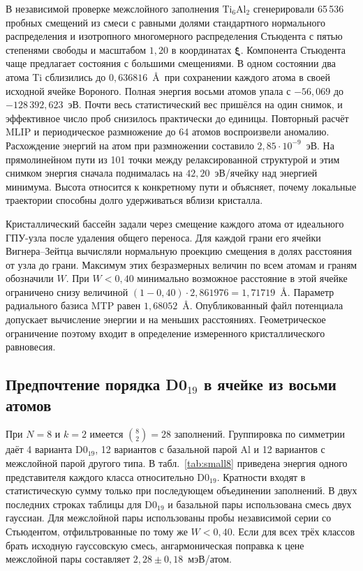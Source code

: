 \documentclass[11pt,a4paper]{article}
\begin{document}
В независимой проверке межслойного заполнения $\mathrm{Ti}_6\mathrm{Al}_2$
сгенерировали 65\,536 пробных смещений из смеси с равными долями
стандартного нормального распределения и изотропного многомерного распределения
Стьюдента с пятью степенями свободы и масштабом $1{,}20$ в координатах
$\boldsymbol\xi$. Компонента Стьюдента чаще предлагает состояния с большими
смещениями. В одном состоянии два атома Ti
сблизились до $0{,}636816$~\AA\ при сохранении каждого атома в своей исходной
ячейке Вороного. Полная энергия восьми атомов упала с $-56{,}069$ до
$-128\,392{,}623$~эВ. Почти весь статистический вес пришёлся на один снимок,
и эффективное число проб снизилось практически до единицы.
Повторный расчёт MLIP и периодическое размножение до 64 атомов воспроизвели
аномалию. Расхождение энергий на атом при размножении составило
$2{,}85\cdot10^{-9}$~эВ. На прямолинейном пути из 101 точки между релаксированной
структурой и этим снимком энергия сначала поднималась на $42{,}20$~эВ/ячейку
над энергией минимума. Высота относится к конкретному пути и объясняет, почему
локальные траектории способны долго удерживаться вблизи кристалла.

Кристаллический бассейн задали через смещение каждого атома от идеального
ГПУ-узла после удаления общего переноса. Для каждой грани его ячейки
Вигнера--Зейтца вычисляли нормальную проекцию смещения в долях расстояния
от узла до грани. Максимум этих безразмерных величин по всем атомам и
граням обозначили $W$. При $W<0{,}40$ минимально возможное расстояние в
этой ячейке ограничено снизу величиной
$(1-0{,}40)\cdot 2{,}861976 = 1{,}71719$~\AA. Параметр радиального базиса
MTP равен $1{,}68052$~\AA. Опубликованный файл потенциала допускает
вычисление энергии и на меньших расстояниях. Геометрическое ограничение
поэтому входит в определение измеренного кристаллического равновесия.

\subsection{Предпочтение порядка \texorpdfstring{D0$_{19}$}{D0₁₉} в ячейке из восьми атомов}

При $N=8$ и $k=2$ имеется $\binom82=28$ заполнений. Группировка по симметрии
даёт 4 варианта D0$_{19}$, 12 вариантов с базальной парой Al и 12 вариантов
с межслойной парой другого типа. В табл.~\ref{tab:small8} приведена энергия
одного представителя каждого класса относительно D0$_{19}$. Кратности входят
в статистическую сумму только при последующем объединении заполнений.
В двух последних строках таблицы для D0$_{19}$ и базальной пары использована
смесь двух гауссиан. Для межслойной пары использованы пробы независимой серии
со Стьюдентом, отфильтрованные по тому же $W<0{,}40$. Если для всех трёх
классов брать исходную гауссовскую смесь, ангармоническая поправка к цене
межслойной пары составляет $2{,}28\pm0{,}18$~мэВ/атом.
\end{document}
